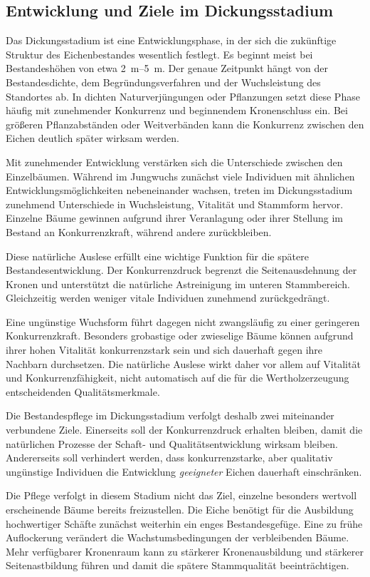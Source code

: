 \documentclass[twocolumn, bibliography=totoc, abstract=true]{scrartcl}
\begin{document}
\subsection{Entwicklung und Ziele im Dickungsstadium}

Das Dickungsstadium ist eine Entwicklungsphase, in der sich die zukünftige Struktur des Eichenbestandes wesentlich festlegt. Es beginnt meist bei Bestandeshöhen von etwa \qtyrange{2}{5}{\m}. Der genaue Zeitpunkt hängt von der Bestandesdichte, dem Begründungsverfahren und der Wuchsleistung des Standortes ab. In dichten Naturverjüngungen oder Pflanzungen setzt diese Phase häufig mit zunehmender Konkurrenz und beginnendem Kronenschluss ein. Bei größeren Pflanzabständen oder Weitverbänden kann die Konkurrenz zwischen den Eichen deutlich später wirksam werden.

Mit zunehmender Entwicklung verstärken sich die Unterschiede zwischen den Einzelbäumen. Während im Jungwuchs zunächst viele Individuen mit ähnlichen Entwicklungsmöglichkeiten nebeneinander wachsen, treten im Dickungsstadium zunehmend Unterschiede in Wuchsleistung, Vitalität und Stammform hervor. Einzelne Bäume gewinnen aufgrund ihrer Veranlagung oder ihrer Stellung im Bestand an Konkurrenzkraft, während andere zurückbleiben.

Diese natürliche Auslese erfüllt eine wichtige Funktion für die spätere Bestandesentwicklung. Der Konkurrenzdruck begrenzt die Seitenausdehnung der Kronen und unterstützt die natürliche Astreinigung im unteren Stammbereich. Gleichzeitig werden weniger vitale Individuen zunehmend zurückgedrängt.

Eine ungünstige Wuchsform führt dagegen nicht zwangsläufig zu einer geringeren Konkurrenzkraft. Besonders grobastige oder zwieselige Bäume können aufgrund ihrer hohen Vitalität konkurrenzstark sein und sich dauerhaft gegen ihre Nachbarn durchsetzen. Die natürliche Auslese wirkt daher vor allem auf Vitalität und Konkurrenzfähigkeit, nicht automatisch auf die für die Wertholzerzeugung entscheidenden Qualitätsmerkmale.

Die Bestandespflege im Dickungsstadium verfolgt deshalb zwei miteinander verbundene Ziele. Einerseits soll der Konkurrenzdruck erhalten bleiben, damit die natürlichen Prozesse der Schaft- und Qualitätsentwicklung wirksam bleiben. Andererseits soll verhindert werden, dass konkurrenzstarke, aber qualitativ ungünstige Individuen die Entwicklung \emph{geeigneter} Eichen dauerhaft einschränken.

Die Pflege verfolgt in diesem Stadium nicht das Ziel, einzelne besonders wertvoll erscheinende Bäume bereits freizustellen. Die Eiche benötigt für die Ausbildung hochwertiger Schäfte zunächst weiterhin ein enges Bestandesgefüge. Eine zu frühe Auflockerung verändert die Wachstumsbedingungen der verbleibenden Bäume. Mehr verfügbarer Kronenraum kann zu stärkerer Kronenausbildung und stärkerer Seitenastbildung führen und damit die spätere Stammqualität beeinträchtigen.
\end{document}
